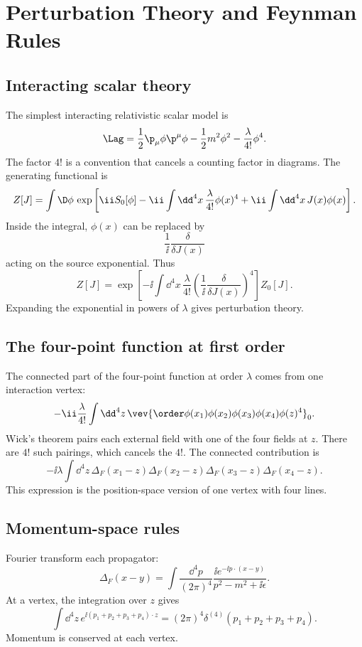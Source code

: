 \chapter{Perturbation Theory and Feynman Rules}

\section{Interacting scalar theory}

The simplest interacting relativistic scalar model is
\[
  \Lag=
  \frac12\p_\mu\phi\p^\mu\phi
  -\frac12m^2\phi^2
  -\frac{\lambda}{4!}\phi^4.
\]
The factor \(4!\) is a convention that cancels a counting factor in diagrams.  The generating functional is
\[
  Z[J]=
  \int\D\phi\,
  \exp\left[
  \ii S_0[\phi]
  -\ii\int\dd^4x\,\frac{\lambda}{4!}\phi(x)^4
  +\ii\int\dd^4x\,J(x)\phi(x)
  \right].
\]
Inside the integral, \(\phi(x)\) can be replaced by
\[
  \frac1{\ii}\frac{\delta}{\delta J(x)}
\]
acting on the source exponential.  Thus
\[
  Z[J]
  =
  \exp\left[
  -\ii\int\dd^4x\,\frac{\lambda}{4!}
  \left(\frac1{\ii}\frac{\delta}{\delta J(x)}\right)^4
  \right]Z_0[J].
\]
Expanding the exponential in powers of \(\lambda\) gives perturbation theory.

\section{The four-point function at first order}

The connected part of the four-point function at order \(\lambda\) comes from one interaction vertex:
\[
  -\ii\frac{\lambda}{4!}
  \int\dd^4z\,
  \vev{\order\phi(x_1)\phi(x_2)\phi(x_3)\phi(x_4)\phi(z)^4}_0.
\]
Wick's theorem pairs each external field with one of the four fields at \(z\).  There are \(4!\) such pairings, which cancels the \(4!\).  The connected contribution is
\[
  -\ii\lambda
  \int\dd^4z\,
  \Delta_F(x_1-z)\Delta_F(x_2-z)
  \Delta_F(x_3-z)\Delta_F(x_4-z).
\]
This expression is the position-space version of one vertex with four lines.

\section{Momentum-space rules}

Fourier transform each propagator:
\[
  \Delta_F(x-y)=
  \int\frac{\dd^4p}{(2\pi)^4}
  \frac{\ii e^{-\ii p\cdot(x-y)}}{p^2-m^2+\ii\epsilon}.
\]
At a vertex, the integration over \(z\) gives
\[
  \int\dd^4z\,e^{\ii(p_1+p_2+p_3+p_4)\cdot z}
  =
  (2\pi)^4\delta^{(4)}(p_1+p_2+p_3+p_4).
\]
Momentum is conserved at each vertex.

